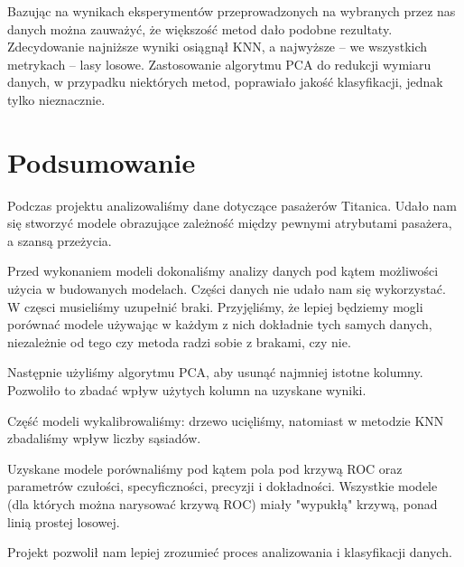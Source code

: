 \documentclass{article}
\begin{document}
Bazując na wynikach eksperymentów przeprowadzonych na wybranych przez nas danych można zauważyć, że większość metod dało podobne rezultaty.
Zdecydowanie najniższe wyniki osiągnął KNN, a najwyższe -- we wszystkich metrykach -- lasy losowe.
Zastosowanie algorytmu PCA do redukcji wymiaru danych, w przypadku niektórych metod, poprawiało jakość klasyfikacji, jednak tylko nieznacznie.

\section{Podsumowanie}
Podczas projektu analizowaliśmy dane dotyczące pasażerów Titanica. Udało nam się stworzyć modele obrazujące zależność między pewnymi atrybutami pasażera, a szansą przeżycia.

Przed wykonaniem modeli dokonaliśmy analizy danych pod kątem możliwości użycia w budowanych modelach. Części danych nie udało nam się wykorzystać.
W częsci musieliśmy uzupełnić braki. Przyjęliśmy, że lepiej będziemy mogli porównać modele używając w każdym z nich dokładnie tych samych danych,
niezależnie od tego czy metoda radzi sobie z brakami, czy nie.

Następnie użyliśmy algorytmu PCA, aby usunąć najmniej istotne kolumny. Pozwoliło to zbadać wpływ użytych kolumn na uzyskane wyniki.

Część modeli wykalibrowaliśmy: drzewo ucięliśmy, natomiast w metodzie KNN zbadaliśmy wpływ liczby sąsiadów.

Uzyskane modele porównaliśmy pod kątem pola pod krzywą ROC oraz parametrów czułości, specyficzności, precyzji i dokładności.
Wszystkie modele (dla których można narysować krzywą ROC) miały "wypukłą" krzywą, ponad linią prostej losowej.

Projekt pozwolił nam lepiej zrozumieć proces analizowania i klasyfikacji danych.
\end{document}
